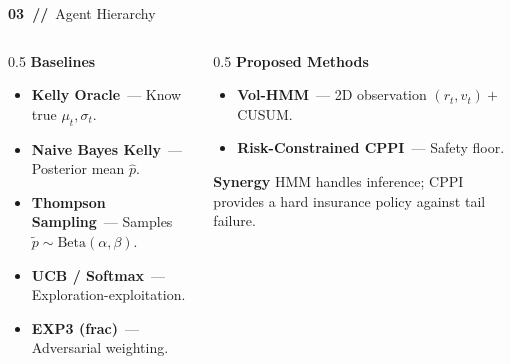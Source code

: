 \documentclass[11pt,aspectratio=169]{beamer}
\newcommand{\ca}[1]{\textcolor{bbamber}{\textbf{#1}}}
\newcommand{\cg}[1]{\textcolor{bbgreen}{\textbf{#1}}}
\newcommand{\cm}[1]{\textcolor{bbmagenta}{\textbf{#1}}}
\begin{document}
\begin{frame}{\ca{03~//}~Agent Hierarchy}
  \begin{columns}[T]
    \begin{column}{0.5\textwidth}
      \ca{Baselines}
      {\small
      \begin{itemize}
        \item \textbf{Kelly Oracle}~— Know true $\mu_t, \sigma_t$.
        \item \textbf{Naive Bayes Kelly}~— Posterior mean $\hat p$.
        \item \textbf{Thompson Sampling}~— Samples $\tilde p\sim\text{Beta}(\alpha,\beta)$.
        \item \textbf{UCB / Softmax}~— Exploration-exploitation.
        \item \textbf{EXP3 (frac)}~— Adversarial weighting.
      \end{itemize}
      }
    \end{column}
    \begin{column}{0.5\textwidth}
      \cg{Proposed Methods}
      {\small
      \begin{itemize}
        \item \cg{Vol-HMM}~— 2D observation $(r_t,v_t) +$ CUSUM.
        \item \cm{Risk-Constrained CPPI}~— Safety floor.
      \end{itemize}
      }
      \vspace{0.8em}
      \ca{Synergy}
      {\small HMM handles inference; CPPI provides a hard insurance policy against tail failure.}
    \end{column}
  \end{columns}
\end{frame}
\end{document}
